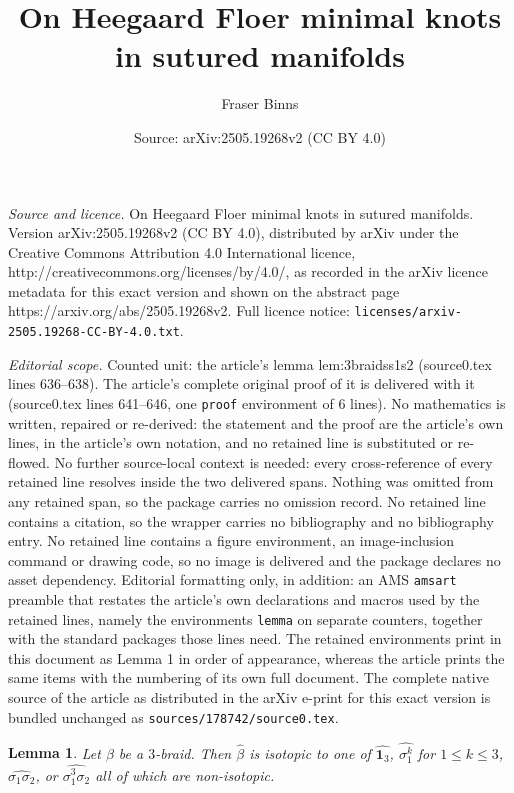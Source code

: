 \documentclass[10pt,a4paper]{amsart}
\title{On Heegaard Floer minimal knots in sutured manifolds}
\author{Fraser Binns}
\date{Source: arXiv:2505.19268v2 (CC BY 4.0)}
\newtheorem{lemma}{Lemma}
\begin{document}
\maketitle

\noindent\emph{Source and licence.} On Heegaard Floer minimal knots in sutured manifolds. Version arXiv:2505.19268v2 (CC BY 4.0), distributed by arXiv under the Creative Commons Attribution 4.0 International licence, http://creativecommons.org/licenses/by/4.0/, as recorded in the arXiv licence metadata for this exact version and shown on the abstract page https://arxiv.org/abs/2505.19268v2. Full licence notice: \texttt{licenses/arxiv-2505.19268-CC-BY-4.0.txt}.\par\smallskip

\noindent\textit{Editorial scope.} Counted unit: the article's lemma lem:3braidss1s2 (source0.tex lines 636--638). The article's complete original proof of it is delivered with it (source0.tex lines 641--646, one \texttt{proof} environment of 6 lines). No mathematics is written, repaired or re-derived: the statement and the proof are the article's own lines, in the article's own notation, and no retained line is substituted or re-flowed.  No further source-local context is needed: every cross-reference of every retained line resolves inside the two delivered spans.  Nothing was omitted from any retained span, so the package carries no omission record.  No retained line contains a citation, so the wrapper carries no bibliography and no bibliography entry.  No retained line contains a figure environment, an image-inclusion command or drawing code, so no image is delivered and the package declares no asset dependency.  Editorial formatting only, in addition: an AMS \texttt{amsart} preamble that restates the article's own declarations and macros used by the retained lines, namely the environments \texttt{lemma} on separate counters, together with the standard packages those lines need.  The retained environments print in this document as Lemma 1 in order of appearance, whereas the article prints the same items with the numbering of its own full document.  The complete native source of the article as distributed in the arXiv e-print for this exact version is bundled unchanged as \texttt{sources/178742/source0.tex}.
\begin{lemma}\label{lem:3braidss1s2}
    Let $\beta$ be a $3$-braid. Then $\widehat{\beta}$ is isotopic to one of $\widehat{\mathbf{1}_3}$, $\widehat{\sigma_1^k}$ for $1\leq k\leq 3$, $\widehat{\sigma_1\sigma_2}$, or $\widehat{\sigma_1^3\sigma_2}$ all of which are non-isotopic.
\end{lemma}
\end{document}
